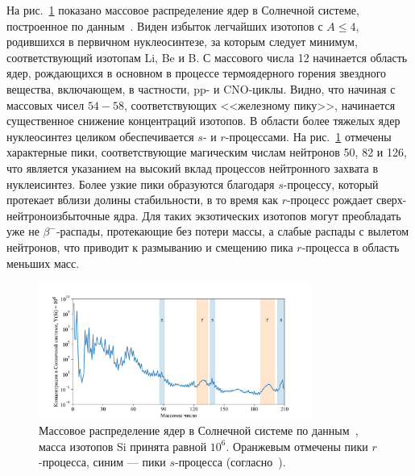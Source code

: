 На рис.~\ref{fig:lodders_vs_ame} показано массовое распределение ядер в Солнечной системе, построенное по данным~\cite{lodders2003}. Виден избыток легчайших изотопов с $A \leq 4$, родившихся в первичном нуклеосинтезе, за которым следует минимум, соответствующий изотопам Li, Be и B. С массового числа 12 начинается область ядер, рождающихся в основном в процессе термоядерного горения звездного вещества, включающем, в частности, pp- и CNO-циклы. Видно, что начиная с массовых чисел $54 - 58$, соответствующих <<железному пику>>, начинается существенное снижение концентраций изотопов. В области более тяжелых ядер нуклеосинтез целиком обеспечивается $s$- и $r$-процессами. На рис.~\ref{fig:lodders_vs_ame} отмечены характерные пики, соответствующие магическим числам нейтронов 50, 82 и 126, что является указанием на высокий вклад процессов нейтронного захвата в нуклеисинтез. Более узкие пики образуются благодаря $s$-процессу, который протекает вблизи долины стабильности, в то время как $r$-процесс рождает сверх-нейтроноизбыточные ядра. Для таких экзотических изотопов могут преобладать уже не $\beta^-$-распады, протекающие без потери массы, а слабые распады с вылетом нейтронов, что приводит к размыванию и смещению пика $r$-процесса в область меньших масс.

\begin{figure}
  \centering
  \includegraphics[width=0.8\textwidth]{pics/lodders_vs_ame.pdf}
  \caption{Массовое распределение ядер в Солнечной системе по данным~\cite{lodders2003}, масса изотопов Si принята равной $10^6$. Оранжевым отмечены пики $r$-процесса, синим --- пики $s$-процесса (согласно~\cite{cowan2021}).}
  \label{fig:lodders_vs_ame}
\end{figure}


